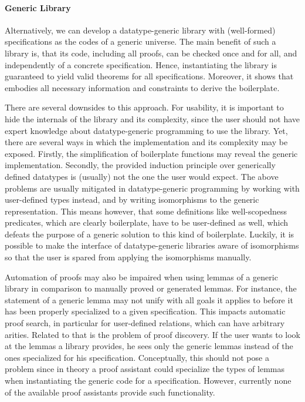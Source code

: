 \paragraph{Generic Library}
Alternatively, we can develop a datatype-generic library with (well-formed)
\Knot specifications as the codes of a generic universe. The main benefit of
such a library is, that its code, including all proofs, can be checked once and
for all, and independently of a concrete specification. Hence, instantiating the
library is guaranteed to yield valid theorems for all specifications. Moreover,
it shows that \Knot embodies all necessary information and constraints to derive
the boilerplate.

There are several downsides to this approach. For usability, it is important to
hide the internals of the library and its complexity, since the user should
not have expert knowledge about datatype-generic programming to
use the library. Yet, there are several ways in which the implementation and
its complexity may be exposed. Firstly, the simplification of
boilerplate functions may reveal the generic implementation. Secondly,
the provided induction principle over generically defined
datatypes is (usually) not the one the user would expect. 
The above problems are usually mitigated in datatype-generic programming by
working with user-defined types instead, and by writing isomorphisms to the
generic representation. This means however, that some definitions like
well-scopedness predicates, which are clearly boilerplate, have to be
user-defined as well, which defeats the purpose of a generic solution to this
kind of boilerplate. Luckily, it is possible to make the interface of
datatype-generic libraries aware of isomorphisms so that the user is spared from
applying the isomorphisms manually.

Automation of proofs may also be impaired when using lemmas of a generic library
in comparison to manually proved or generated lemmas. For instance, the
statement of a generic lemma may not unify with all goals it applies to before
it has been properly specialized to a given specification. This impacts
automatic proof search, in particular for user-defined relations, which can have
arbitrary arities. Related to that is the problem of proof discovery. If the
user wants to look at the lemmas a library provides, he sees only the generic
lemmas instead of the ones specialized for his specification. Conceptually, this
should not pose a problem since in theory a proof assistant could specialize the
types of lemmas when instantiating the generic code for a specification.
However, currently none of the available proof assistants provide such
functionality.


